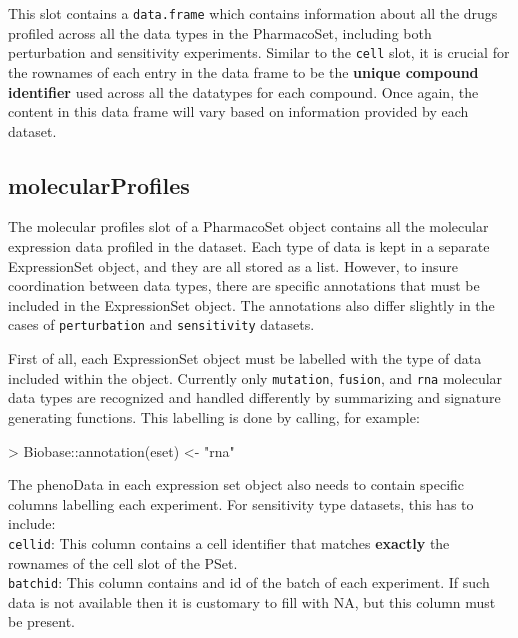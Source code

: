 \documentclass[11pt]{article}
\begin{document}
This slot contains a \texttt{data.frame} which contains information about all the drugs profiled across all the data types in the PharmacoSet, including both perturbation and sensitivity experiments. Similar to the \texttt{cell} slot, it is crucial for the rownames of each entry in the data frame to be the \textbf{unique compound identifier} used across all the datatypes for each compound. Once again, the content in this data frame will vary based on information provided by each dataset. 


\subsection{molecularProfiles}

The molecular profiles slot of a PharmacoSet object contains all the molecular expression data profiled in the dataset. Each type of data is kept in a separate ExpressionSet object, and they are all stored as a list. However, to insure coordination between data types, there are specific annotations that must be included in the ExpressionSet object. The annotations also differ slightly in the cases of \texttt{perturbation} and \texttt{sensitivity} datasets. 

First of all, each ExpressionSet object must be labelled with the type of data included within the object. Currently only \texttt{mutation}, \texttt{fusion}, and \texttt{rna} molecular data types are recognized and handled differently by summarizing and signature generating functions. This labelling is done by calling, for example:
\begin{Schunk}
\begin{Sinput}
> Biobase::annotation(eset) <- "rna"
\end{Sinput}
\end{Schunk}

The phenoData in each expression set object also needs to contain specific columns labelling each experiment. For sensitivity type datasets, this has to include:  \\

\texttt{cellid}: This column contains a cell identifier that matches \textbf{exactly} the rownames of the cell slot of the PSet.\\
\texttt{batchid}: This column contains and id of the batch of each experiment. If such data is not available then it is customary to fill with NA, but this column must be present.\\
\end{document}
